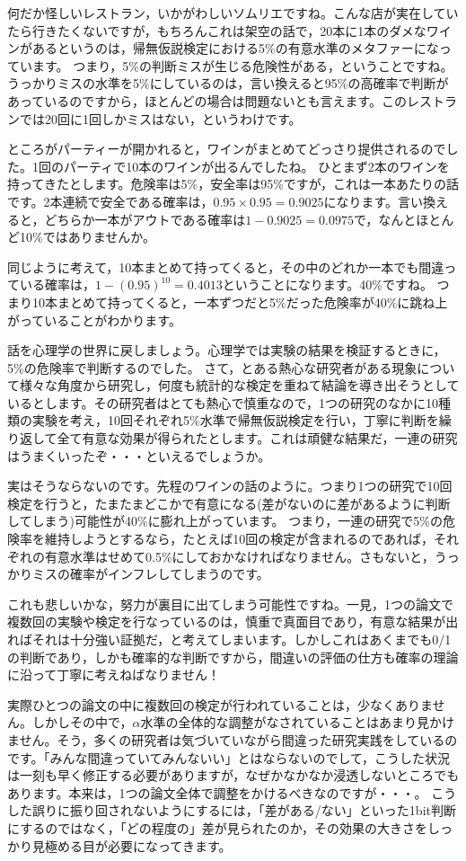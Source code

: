 \documentclass{ltjsarticle}
\begin{document}
何だか怪しいレストラン，いかがわしいソムリエですね。こんな店が実在していたら行きたくないですが，もちろんこれは架空の話で，20本に1本のダメなワインがあるというのは，帰無仮説検定における5\%の有意水準のメタファーになっています。
つまり，5\%の判断ミスが生じる危険性がある，ということですね。
うっかりミスの水準を5\%にしているのは，言い換えると95\%の高確率で判断があっているのですから，ほとんどの場合は問題ないとも言えます。このレストランでは20回に1回しかミスはない，というわけです。

ところがパーティーが開かれると，ワインがまとめてどっさり提供されるのでした。1回のパーティで10本のワインが出るんでしたね。
ひとまず2本のワインを持ってきたとします。危険率は5\%，安全率は95\%ですが，これは一本あたりの話です。2本連続で安全である確率は，$0.95\times 0.95=0.9025$になります。言い換えると，どちらか一本がアウトである確率は$1-0.9025=0.0975$で，なんとほとんど10\%ではありませんか。

同じように考えて，10本まとめて持ってくると，その中のどれか一本でも間違っている確率は，$1-(0.95)^{10}=0.4013$ということになります。40\%ですね。
つまり10本まとめて持ってくると，一本ずつだと5\%だった危険率が40\%に跳ね上がっていることがわかります。

話を心理学の世界に戻しましょう。心理学では実験の結果を検証するときに，5\%の危険率で判断するのでした。
さて，とある熱心な研究者がある現象について様々な角度から研究し，何度も統計的な検定を重ねて結論を導き出そうとしているとします。その研究者はとても熱心で慎重なので，1つの研究のなかに10種類の実験を考え，10回それぞれ5\%水準で帰無仮説検定を行い，丁寧に判断を繰り返して全て有意な効果が得られたとします。これは頑健な結果だ，一連の研究はうまくいったぞ・・・といえるでしょうか。

実はそうならないのです。先程のワインの話のように。つまり1つの研究で10回検定を行うと，たまたまどこかで有意になる(差がないのに差があるように判断してしまう)可能性が40\%に膨れ上がっています。
つまり，一連の研究で5\%の危険率を維持しようとするなら，たとえば10回の検定が含まれるのであれば，それぞれの有意水準はせめて0.5\%にしておかなければなりません。さもないと，うっかりミスの確率がインフレしてしまうのです。

これも悲しいかな，努力が裏目に出てしまう可能性ですね。一見，1つの論文で複数回の実験や検定を行なっているのは，慎重で真面目であり，有意な結果が出ればそれは十分強い証拠だ，と考えてしまいます。しかしこれはあくまでも0/1の判断であり，しかも確率的な判断ですから，間違いの評価の仕方も確率の理論に沿って丁寧に考えねばなりません！

実際ひとつの論文の中に複数回の検定が行われていることは，少なくありません。しかしその中で，$\alpha$水準の全体的な調整がなされていることはあまり見かけません。そう，多くの研究者は気づいていながら間違った研究実践をしているのです。「みんな間違っていてみんないい」とはならないのでして，こうした状況は一刻も早く修正する必要がありますが，なぜかなかなか浸透しないところでもあります。本来は，1つの論文全体で調整をかけるべきなのですが・・・。
こうした誤りに振り回されないようにするには，「差がある/ない」といった1bit判断にするのではなく，「どの程度の」差が見られたのか，その効果の大きさをしっかり見極める目が必要になってきます。
\end{document}
